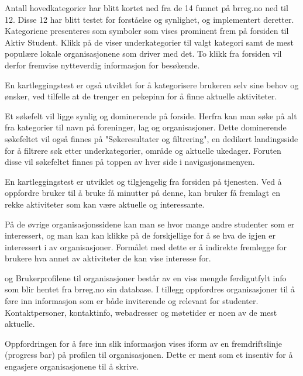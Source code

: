 
Antall hovedkategorier har blitt kortet ned fra de 14 funnet på brreg.no ned til 12. Disse 12 har blitt testet for forståelse og synlighet, og implementert deretter. Kategoriene presenteres som symboler som vises prominent frem på forsiden til Aktiv Student. Klikk på de viser underkategorier til valgt kategori samt de mest populære lokale organisasjonene som driver med det. To klikk fra forsiden vil derfor fremvise nytteverdig informasjon for besøkende. 

En kartleggingstest er også utviklet for å kategorisere brukeren selv sine behov og ønsker, ved tilfelle at de trenger en pekepinn for å finne aktuelle aktiviteter.


Et søkefelt vil ligge synlig og dominerende på forside. Herfra kan man søke på alt fra kategorier til navn på foreninger, lag og organisasjoner. Dette dominerende søkefeltet vil også finnes på "Søkeresultater og filtrering", en dedikert landingsside for å filtrere søk etter underkategorier, område og aktuelle ukedager. Foruten disse vil søkefeltet finnes på toppen av hver side i navigasjonsmenyen.


En kartleggingstest er utviklet og tilgjengelig fra forsiden på tjenesten. Ved å oppfordre bruker til å bruke få minutter på denne, kan bruker få fremlagt en rekke aktiviteter som kan være aktuelle og interessante.

På de øvrige organisasjonssidene kan man se hvor mange andre studenter som er interessert, og man kan kan klikke på de forskjellige for å se hva de igjen er interessert i av organisasjoner. Formålet med dette er å indirekte fremlegge for brukere hva annet av aktiviteter de kan vise interesse for.

 og 
Brukerprofilene til organisasjoner består av en viss mengde ferdigutfylt info som blir hentet fra brreg.no sin database. I tillegg oppfordres organisasjoner til å føre inn informasjon som er både inviterende og relevant for studenter. Kontaktpersoner, kontaktinfo, webadresser og møtetider er noen av de mest aktuelle.

Oppfordringen for å føre inn slik informasjon vises iform av en fremdriftslinje (progress bar) på profilen til organisasjonen. Dette er ment som et insentiv for å engasjere organisasjonene til å skrive.

